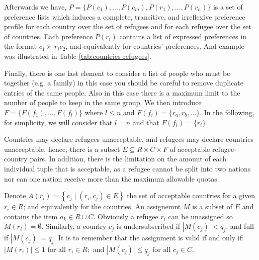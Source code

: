 \documentclass[letterpaper]{article} %
\begin{document}
    Afterwards we have, \(P = \{P(c_1), \dots , P(c_m), P(r_1), \dots , P(r_n)\}\) is
    a set of preference lists which induces a complete, transitive, and irreflexive preference profile for each
    country over the set of refugees and for each refugee over the set of countries.
    Each preference \(P(r_i)\) contains a list of expressed preferences in the format \( c _ { 1 } \succ r _ { i } c _ { 2 } \),
    and equivalently for countries' preferences.
    And example was illustrated in Table \ref{tab:countries-refugees}.

    Finally, there is one last element to consider a list of people who must be together (e.g. a family)
    in this case you should be careful to remove duplicate entries of the same people. Also in this case there is a maximum limit to the number of people to keep in the same group.
    We then introduce \(F=\{F(f_1), ..., F(f_l)\}\) where \(l\leq n\) and \(F(f_i) = \{r_a, r_b, ...\}\).
    In the following, for simplicity, we will consider that \(l=n\) and that \(F(f_i)=\{r_i\}\).

    Countries may declare refugees unacceptable, and refugees may declare countries unacceptable,
    hence, there is a subset \(E \subseteq R \times C \times F\) of acceptable refugee-country pairs.
    In addition, there is the limitation on the amount of each individual tuple that is acceptable, as a refugee cannot be split into two nations nor can one nation receive more than the maximum allowable quotas.

    Denote \( A \left( r _ { i } \right) = \left\{ c _ { j } \mid \left( r _ { i } , c _ { j } \right) \in E \right\} \)
    the set of acceptable countries for a given \( r _ { i } \in R \); and equivalently for the countries.
    An assignemnt \(M\) is a subset of \(E\) and contains the item \( a _ { k } \in R \cup C \). Obviously a refugee \( r _ { i } \) can be unassigned so \( M \left( r _ { i } \right) = \emptyset \).
    Similarly, a country \( c _ { j } \) is
    undersubscribed if \( \left| M \left( c _ { j } \right) \right| < q _ { j } \), and full if \( \left| M \left( c _ { j } \right) \right| = q _ { j } \).
    It is to remember that the assignment is valid if and only if:
    \( \left| M \left( r _ { i } \right) \right| \leq 1 \) for all \( r _ { i } \in R ; \) and
    \( \left| M \left( c _ { j } \right) \right| \leq q _ { j } \) for all \( c _ { j } \in C  \).
\end{document}
